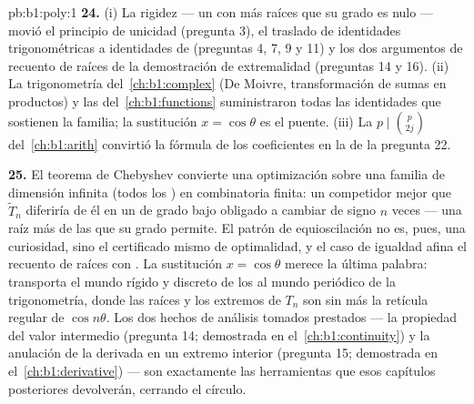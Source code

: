 \begin{solution}{pb:b1:poly:1}
\textbf{24.} (i) La rigidez --- un  con más raíces que su
grado es nulo --- movió el principio de unicidad (pregunta 3), el
traslado de identidades trigonométricas a identidades de 
(preguntas 4, 7, 9 y 11) y los dos argumentos de recuento de raíces de
la demostración de extremalidad (preguntas 14 y 16). (ii) La
trigonometría del~\cref{ch:b1:complex} (De Moivre, transformación de
sumas en productos) y las 
del~\cref{ch:b1:functions} suministraron todas las identidades que
sostienen la familia; la sustitución $x = \cos\theta$ es el puente.
(iii) La  $p \mid \binom p{2j}$ del~\cref{ch:b1:arith}
convirtió la fórmula de los coeficientes en la  de la pregunta 22.

\textbf{25.} El teorema de Chebyshev convierte una optimización sobre
una familia de dimensión infinita (todos los ) en
combinatoria finita: un competidor mejor que $\widetilde T_n$ diferiría
de él en un  de grado bajo obligado a cambiar de signo $n$
veces --- una raíz más de las que su grado permite. El patrón de
equioscilación no es, pues, una curiosidad, sino el certificado mismo
de optimalidad, y el caso de igualdad afina el recuento de raíces con
. La sustitución $x = \cos\theta$ merece la última
palabra: transporta el mundo rígido y discreto de los  al
mundo periódico de la trigonometría, donde las raíces y los extremos de
$T_n$ son sin más la retícula regular de $\cos n\theta$. Los dos hechos
de análisis tomados prestados --- la propiedad del valor intermedio
(pregunta 14; demostrada en el~\cref{ch:b1:continuity}) y la anulación
de la derivada en un extremo interior (pregunta 15; demostrada en
el~\cref{ch:b1:derivative}) --- son exactamente las herramientas que
esos capítulos posteriores devolverán, cerrando el círculo.
\end{solution}
